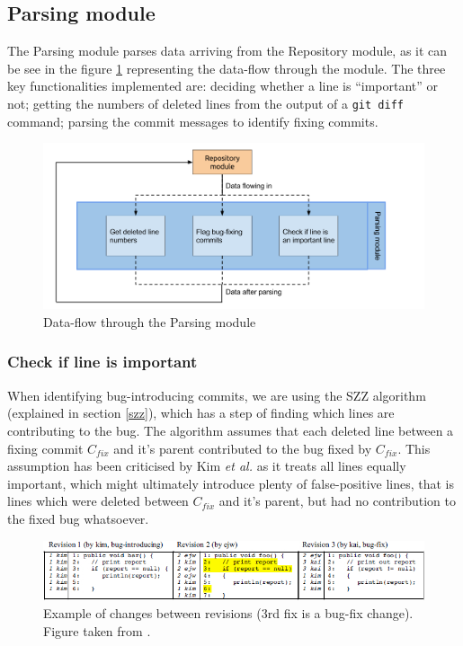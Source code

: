 \documentclass[12pt,twoside,notitlepage]{report}
\newcommand{\etal}{\textit{et al.}}
\begin{document}
\subsection{Parsing module}\label{parsing}
The Parsing module parses data arriving from the Repository module, as it can be see in the figure \ref{parsing_module} representing the data-flow through the module. The three key functionalities implemented are: deciding whether a line is ``important'' or not; getting the numbers of deleted lines from the output of a \texttt{git diff} command; parsing the commit messages to identify fixing commits. 
\begin{figure}[h]
\includegraphics[width=1.0\textwidth]{parsing_module.png}
\caption{Data-flow through the Parsing module}

\label{parsing_module}
\end{figure}
\subsubsection*{Check if line is important}
When identifying bug-introducing commits, we are using the SZZ algorithm (explained in section \ref{szz}), which has a step of finding which lines are contributing to the bug. The algorithm assumes that each deleted line between a fixing commit $C_{fix}$ and it's parent contributed to the bug fixed by $C_{fix}$.
\clearpage
This assumption has been criticised by Kim \etal{} \cite{KimZim} as it treats all lines equally important, which might ultimately introduce plenty of false-positive lines, that is lines which were deleted between $C_{fix}$ and it's parent, but had no contribution to the fixed bug whatsoever.
\begin{figure}[t]
\includegraphics[width=1.0\textwidth]{automatic_identification.jpg}
\caption[Example of changes between revisions.]{Example of changes between revisions (3rd fix is a bug-fix change). Figure taken from \cite{KimZim}.}
\label{automatic_identification}
\end{figure}
\end{document}
